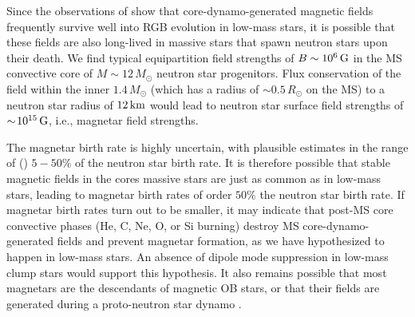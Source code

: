 Since the observations of \cite{Stello_2016} show that core-dynamo-generated magnetic fields frequently survive well into RGB evolution in low-mass stars, it is possible that these fields are also long-lived in massive stars that spawn neutron stars upon their death. We find typical equipartition field strengths of $B \sim 10^6 \, {\rm G}$ in the MS convective core of $M \sim 12 \, M_\odot$ neutron star progenitors. Flux conservation of the field within the inner $1.4 \, M_\odot$ (which has a radius of $\sim \! 0.5 \, R_\odot$ on the MS) to a neutron star radius of $12 \, {\rm km}$ would lead to neutron star surface field strengths of $\sim \! 10^{15} \, {\rm G}$, i.e., magnetar field strengths.  

The magnetar birth rate is highly uncertain, with plausible estimates in the range of (\cite{keane_1998,mereghetti_2015}) $5-50\%$ of the neutron star birth rate. It is therefore possible that stable magnetic fields in the cores massive stars are just as common as in low-mass stars, leading to magnetar birth rates of order $50 \%$ the neutron star birth rate.  
If magnetar birth rates turn out to be smaller, it may indicate that post-MS core convective phases (He, C, Ne, O, or Si burning) destroy MS core-dynamo-generated fields and prevent magnetar formation, as we have hypothesized to happen in low-mass stars. 
An absence of dipole mode suppression in low-mass clump stars would support this hypothesis. It also remains possible that most magnetars are the descendants of magnetic OB stars, or that their fields are generated during a proto-neutron star dynamo \cite{1992ApJ...392L...9D}.



  
  
  
  
  
  
  
  
  
  
  